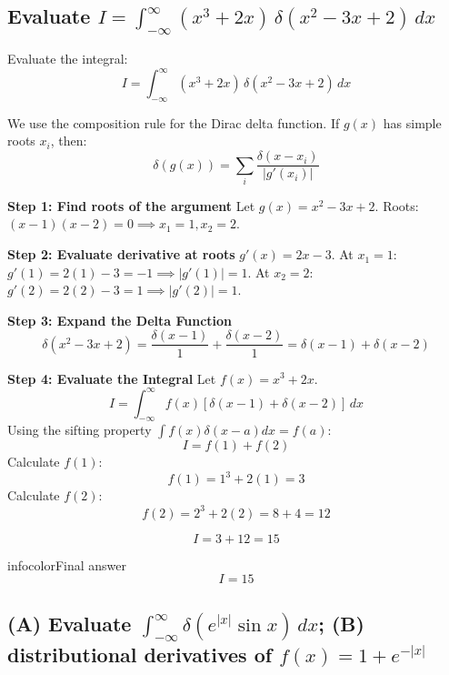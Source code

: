 \documentclass[a4paper,11pt]{article} %
\newenvironment{summarybox}[1][]{\begin{custombox}[#1]{infocolor}{Final answer}}{\end{custombox}}
\begin{document}
\newpage

\subsection{\texorpdfstring{Evaluate $I=\int_{-\infty}^{\infty}(x^3+2x)\,\delta(x^2-3x+2)\,dx$}{Apply delta composition rule $\delta(g(x))=\sum_i\delta(x-x_i)/|g'(x_i)|$; roots at $x=1,2$; $I=15$}}

\begin{problembox}
Evaluate the integral:
$$I = \int_{-\infty}^{\infty} (x^3 + 2x) \, \delta(x^2 - 3x + 2) \, dx$$
\end{problembox}


We use the composition rule for the Dirac delta function. If $g(x)$ has simple roots $x_i$, then:
$$ \delta(g(x)) = \sum_i \frac{\delta(x - x_i)}{|g'(x_i)|} $$

\textbf{Step 1: Find roots of the argument}
Let $g(x) = x^2 - 3x + 2$.
Roots: $(x-1)(x-2) = 0 \implies x_1 = 1, x_2 = 2$.

\textbf{Step 2: Evaluate derivative at roots}
$g'(x) = 2x - 3$.
At $x_1 = 1$: $g'(1) = 2(1) - 3 = -1 \implies |g'(1)| = 1$.
At $x_2 = 2$: $g'(2) = 2(2) - 3 = 1 \implies |g'(2)| = 1$.

\textbf{Step 3: Expand the Delta Function}
$$ \delta(x^2 - 3x + 2) = \frac{\delta(x-1)}{1} + \frac{\delta(x-2)}{1} = \delta(x-1) + \delta(x-2) $$

\textbf{Step 4: Evaluate the Integral}
Let $f(x) = x^3 + 2x$.
$$ I = \int_{-\infty}^{\infty} f(x) [\delta(x-1) + \delta(x-2)] \, dx $$
Using the sifting property $\int f(x)\delta(x-a)dx = f(a)$:
$$ I = f(1) + f(2) $$
Calculate $f(1)$:
$$ f(1) = 1^3 + 2(1) = 3 $$
Calculate $f(2)$:
$$ f(2) = 2^3 + 2(2) = 8 + 4 = 12 $$

$$ I = 3 + 12 = 15 $$

\begin{summarybox}
$$ I = 15 $$
\end{summarybox}

\newpage

\subsection{\texorpdfstring{(A) Evaluate $\int_{-\infty}^{\infty}\delta(e^{|x|}\sin x)\,dx$; (B) distributional derivatives of $f(x)=1+e^{-|x|}$}{(A) Roots at $x=n\pi$; geometric series gives $\coth(\pi/2)$; (B) $f''=e^{-|x|}-2\delta(x)$}}
\end{document}

